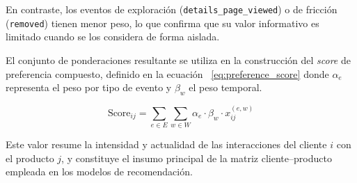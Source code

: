 En contraste, los eventos de exploración (\texttt{details\_page\_viewed}) o de fricción (\texttt{removed}) tienen menor peso, lo que confirma que su valor informativo es limitado cuando se los considera de forma aislada.

El conjunto de ponderaciones resultante se utiliza en la construcción del \textit{score} de preferencia compuesto, definido en la ecuación ~\ref{eq:preference_score} donde $\alpha_e$ representa el peso por tipo de evento y $\beta_w$ el peso temporal.

\begin{equation}
\label{eq:preference_score}
\text{Score}_{ij} = \sum_{e \in E} \sum_{w \in W} \alpha_e \cdot \beta_w \cdot x_{ij}^{(e,w)}
\end{equation}

Este valor resume la intensidad y actualidad de las interacciones del cliente $i$ con el producto $j$, y constituye el insumo principal de la matriz cliente–producto empleada en los modelos de recomendación.